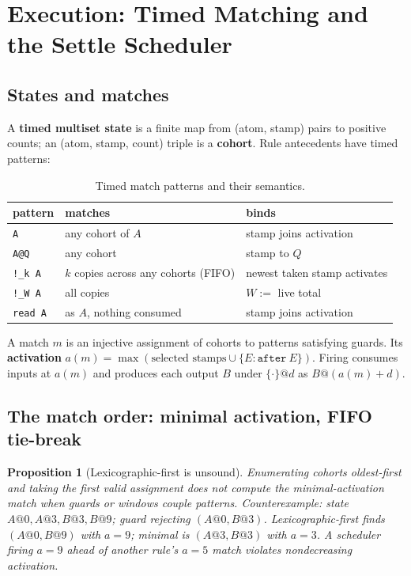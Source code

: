 \documentclass[11pt]{article}
\newcommand{\laxb}[1]{\{#1\}}
\newtheorem{proposition}[theorem]{Proposition}
\theoremstyle{remark}
\begin{document}
\section{Execution: Timed Matching and the Settle Scheduler}
\label{sec:execution}

\subsection{States and matches}
\label{sec:states-matches}

A \textbf{timed multiset state} is a finite map from (atom, stamp) pairs to
positive counts; an (atom, stamp, count) triple is a \textbf{cohort}.  Rule
antecedents have timed patterns:

\begin{table}[ht]
\centering
\begin{tabular}{@{}lll@{}}
\toprule
pattern        & matches                              & binds \\
\midrule
\texttt{A}     & any cohort of $A$                    & stamp joins activation \\
\texttt{A@Q}   & any cohort                           & stamp to $Q$ \\
\texttt{!\_k A}& $k$ copies across any cohorts (FIFO) & newest taken stamp activates \\
\texttt{!\_W A}& all copies                           & $W :=$ live total \\
\texttt{read A}& as $A$, nothing consumed             & stamp joins activation \\
\bottomrule
\end{tabular}
\caption{Timed match patterns and their semantics.}
\label{tab:patterns}
\end{table}

A match $m$ is an injective assignment of cohorts to patterns satisfying guards.
Its \textbf{activation} $a(m) = \max(\text{selected stamps} \cup \{E : \texttt{after}\ E\})$.
Firing consumes inputs at $a(m)$ and produces each output $B$ under $\laxb{\cdot}@d$
as $B@(a(m)+d)$.

\subsection{The match order: minimal activation, FIFO tie-break}
\label{sec:match-order}

\begin{proposition}[Lexicographic-first is unsound]
Enumerating cohorts oldest-first and taking the first valid assignment does not
compute the minimal-activation match when guards or windows couple patterns.
\textit{Counterexample}: state $A@0, A@3, B@3, B@9$; guard rejecting
$(A@0, B@3)$.  Lexicographic-first finds $(A@0, B@9)$ with $a = 9$; minimal is
$(A@3, B@3)$ with $a = 3$.  A scheduler firing $a = 9$ ahead of another rule's
$a = 5$ match violates nondecreasing activation.
\end{proposition}
\end{document}
